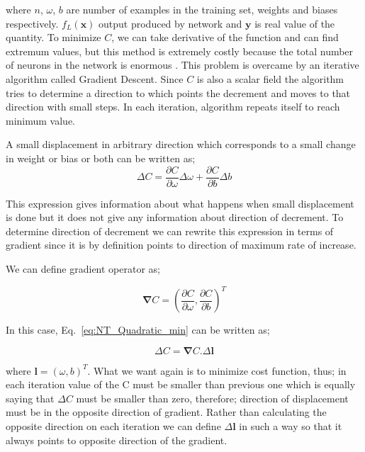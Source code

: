 \documentclass[a4paper,times,12pt]{article}
\begin{document}
\noindent where $n$, $\omega$, $b$ are number of examples in the training set, weights and biases respectively. $f_L(\boldsymbol{x})$ output produced by network and $\boldsymbol{y}$ is real value of the quantity. To minimize $C$, we can take derivative of the function and can find extremum values, but this method is extremely costly because the total number of neurons in the network is enormous \cite{nielsen2015neural}. This problem is overcame by an iterative algorithm called Gradient Descent. Since $C$ is also a scalar field the algorithm tries to determine a direction to which points the decrement and moves to that direction with small steps. In each iteration, algorithm repeats itself to reach minimum value. 

A small displacement in arbitrary direction which corresponds to a small change in weight or bias or both can be written as;
\begin{equation}
\label{eq:NT_Quadratic_min}
\Delta{C} = \frac{\partial{C}}{\partial{\omega}}\Delta{\omega} + \frac{\partial{C}}{\partial{b}}\Delta{b}
\end{equation}

\noindent This expression gives information about what happens when small displacement is done but it does not give any information about direction of decrement. To determine direction of decrement we can rewrite this expression in terms of gradient since it is by definition points to direction of maximum rate of increase. 

We can define gradient operator as;

\begin{equation}
\label{eq:gradient}
\boldsymbol{\nabla}{C} = \left(\frac{\partial{C}}{\partial{\omega}},\frac{\partial{C}}{\partial{b}} \right)^T
\end{equation}

\noindent In this case, Eq.~\ref{eq:NT_Quadratic_min} can be written as;

\begin{equation}
\label{eq:NT_Quadratic_min_gradient_form}
\Delta{C} = \boldsymbol{\nabla}{C} \boldsymbol{.} \Delta \boldsymbol{l}
\end{equation}

\noindent where $\boldsymbol{l} = (\omega, b)^T$. What we want again is to minimize cost function, thus; in each iteration value of the C must be smaller than previous one which is equally saying that $\Delta{C}$ must be smaller than zero, therefore; direction of displacement must be in the opposite direction of gradient. Rather than calculating the opposite direction on each iteration we can define $\Delta{\boldsymbol{l}}$ in such a way so that it always points to opposite direction of the gradient.
\end{document}
